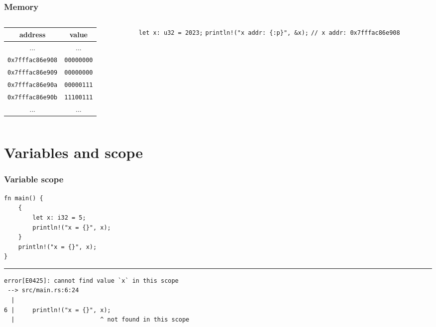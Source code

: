\documentclass{beamer}
\begin{document}
\begin{frame}[fragile]
    \frametitle{Memory}
    \begin{columns}
        \begin{column}{0.5\textwidth}
            \begin{tabular}{ |c|c| } 
                \hline
                address & value \\
                \hline \hline
                ... & ... \\ \hline
                \verb|0x7fffac86e908| & \verb|00000000| \\ \hline
                \verb|0x7fffac86e909| & \verb|00000000| \\ \hline
                \verb|0x7fffac86e90a| & \verb|00000111| \\ \hline
                \verb|0x7fffac86e90b| & \verb|11100111| \\ \hline
                ... & ... \\ \hline
            \end{tabular}
        \end{column}
        \begin{column}{0.5\textwidth}
            \verb|let x: u32 = 2023;|
            \verb|println!("x addr: {:p}", &x);|
            \verb|// x addr: 0x7fffac86e908|
        \end{column}
    \end{columns}
\end{frame}

\section{Variables and scope}
\begin{frame}[fragile]
    \frametitle{Variable scope}
    \begin{verbatim}
fn main() {
    {
        let x: i32 = 5;
        println!("x = {}", x);
    }
    println!("x = {}", x);
}
    \end{verbatim}
    \hrule
    \begin{verbatim}
error[E0425]: cannot find value `x` in this scope
 --> src/main.rs:6:24
  |
6 |     println!("x = {}", x);
  |                        ^ not found in this scope
    \end{verbatim}
\end{frame}
\end{document}
